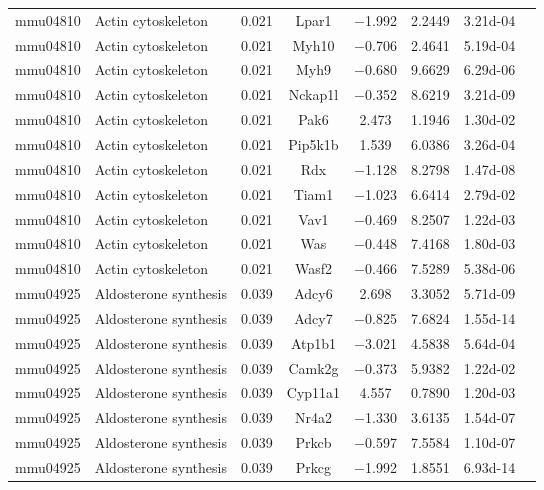 {\begin{longtable}[l]{cp{4.3cm}cccccc}
mmu04810	& Actin cytoskeleton	& \num{0.021}	& Lpar1	& \num{-1.992}	& \num{ 2.2449}	& \num{3.21d-04}\\ 
mmu04810	& Actin cytoskeleton	& \num{0.021}	& Myh10	& \num{-0.706}	& \num{ 2.4641}	& \num{5.19d-04}\\ 
mmu04810	& Actin cytoskeleton	& \num{0.021}	& Myh9	& \num{-0.680}	& \num{ 9.6629}	& \num{6.29d-06}\\ 
mmu04810	& Actin cytoskeleton	& \num{0.021}	& Nckap1l	& \num{-0.352}	& \num{ 8.6219}	& \num{3.21d-09}\\ 
mmu04810	& Actin cytoskeleton	& \num{0.021}	& Pak6	& \num{ 2.473}	& \num{ 1.1946}	& \num{1.30d-02}\\ 
mmu04810	& Actin cytoskeleton	& \num{0.021}	& Pip5k1b	& \num{ 1.539}	& \num{ 6.0386}	& \num{3.26d-04}\\ 
mmu04810	& Actin cytoskeleton	& \num{0.021}	& Rdx	& \num{-1.128}	& \num{ 8.2798}	& \num{1.47d-08}\\ 
mmu04810	& Actin cytoskeleton	& \num{0.021}	& Tiam1	& \num{-1.023}	& \num{ 6.6414}	& \num{2.79d-02}\\ 
mmu04810	& Actin cytoskeleton	& \num{0.021}	& Vav1	& \num{-0.469}	& \num{ 8.2507}	& \num{1.22d-03}\\ 
mmu04810	& Actin cytoskeleton	& \num{0.021}	& Was	& \num{-0.448}	& \num{ 7.4168}	& \num{1.80d-03}\\ 
mmu04810	& Actin cytoskeleton	& \num{0.021}	& Wasf2	& \num{-0.466}	& \num{ 7.5289}	& \num{5.38d-06}\\ 
mmu04925	& Aldosterone synthesis	& \num{0.039}	& Adcy6	& \num{ 2.698}	& \num{ 3.3052}	& \num{5.71d-09}\\ 
mmu04925	& Aldosterone synthesis	& \num{0.039}	& Adcy7	& \num{-0.825}	& \num{ 7.6824}	& \num{1.55d-14}\\ 
mmu04925	& Aldosterone synthesis	& \num{0.039}	& Atp1b1	& \num{-3.021}	& \num{ 4.5838}	& \num{5.64d-04}\\ 
mmu04925	& Aldosterone synthesis	& \num{0.039}	& Camk2g	& \num{-0.373}	& \num{ 5.9382}	& \num{1.22d-02}\\ 
mmu04925	& Aldosterone synthesis	& \num{0.039}	& Cyp11a1	& \num{ 4.557}	& \num{ 0.7890}	& \num{1.20d-03}\\ 
mmu04925	& Aldosterone synthesis	& \num{0.039}	& Nr4a2	& \num{-1.330}	& \num{ 3.6135}	& \num{1.54d-07}\\ 
mmu04925	& Aldosterone synthesis	& \num{0.039}	& Prkcb	& \num{-0.597}	& \num{ 7.5584}	& \num{1.10d-07}\\ 
mmu04925	& Aldosterone synthesis	& \num{0.039}	& Prkcg	& \num{-1.992}	& \num{ 1.8551}	& \num{6.93d-14}\\ 

\end{longtable}}
